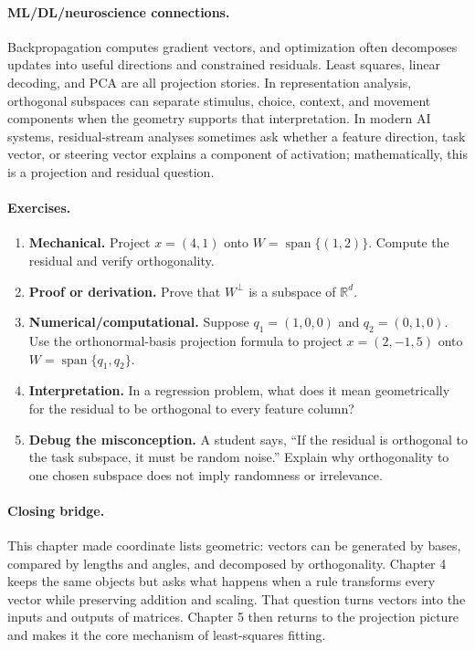 \paragraph{ML/DL/neuroscience connections.}
Backpropagation computes gradient vectors, and optimization often decomposes updates into useful directions and constrained residuals. Least squares, linear decoding, and PCA are all projection stories. In representation analysis, orthogonal subspaces can separate stimulus, choice, context, and movement components when the geometry supports that interpretation. In modern AI systems, residual-stream analyses sometimes ask whether a feature direction, task vector, or steering vector explains a component of activation; mathematically, this is a projection and residual question.

\paragraph{Exercises.}
\begin{enumerate}[label=\textbf{3.4.\arabic*.}, leftmargin=*]
\item \textbf{Mechanical.} Project \(x=(4,1)\) onto \(W=\operatorname{span}\{(1,2)\}\). Compute the residual and verify orthogonality.
\item \textbf{Proof or derivation.} Prove that \(W^\perp\) is a subspace of \(\mathbb{R}^d\).
\item \textbf{Numerical/computational.} Suppose \(q_1=(1,0,0)\) and \(q_2=(0,1,0)\). Use the orthonormal-basis projection formula to project \(x=(2,-1,5)\) onto \(W=\operatorname{span}\{q_1,q_2\}\).
\item \textbf{Interpretation.} In a regression problem, what does it mean geometrically for the residual to be orthogonal to every feature column?
\item \textbf{Debug the misconception.} A student says, ``If the residual is orthogonal to the task subspace, it must be random noise.'' Explain why orthogonality to one chosen subspace does not imply randomness or irrelevance.
\end{enumerate}

\paragraph{Closing bridge.}
This chapter made coordinate lists geometric: vectors can be generated by bases, compared by lengths and angles, and decomposed by orthogonality. Chapter 4 keeps the same objects but asks what happens when a rule transforms every vector while preserving addition and scaling. That question turns vectors into the inputs and outputs of matrices. Chapter 5 then returns to the projection picture and makes it the core mechanism of least-squares fitting.

\clearpage
